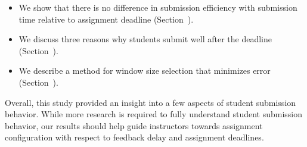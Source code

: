 \begin{itemize}
\item We show that there is no difference in submission efficiency with
  submission time relative to assignment deadline
  (Section~).
\item We discuss three reasons why students submit well after the deadline
  (Section~).
\item We describe a method for window size selection that minimizes error
  (Section~).
\end{itemize}

Overall, this study provided an insight into a few aspects of student
submission behavior. While more research is required to fully understand
student submission behavior, our results should help guide instructors towards
assignment configuration with respect to feedback delay and assignment
deadlines.
